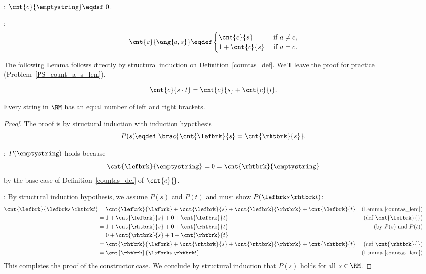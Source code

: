 \begin{definition}\label{countas_def} \mbox{}

: $\cnt{c}{\emptystring} \eqdef\ 0$.

:
\[
\cnt{c}{\ang{a,s}} \eqdef \begin{cases}
                           \cnt{c}{s}  &\text{ if } a \neq c,\\
                           1 + \cnt{c}{s} &\text{ if } a = c.
                           \end{cases}
\]
\end{definition}

The following Lemma follows directly by structural induction on
Definition~\ref{countas_def}.  We'll leave the proof for practice
(Problem~\ref{PS_count_a_s_lem}).

\begin{lemma}\label{countas_lem}
\[
\cnt{c}{s \cdot t} = \cnt{c}{s} + \cnt{c}{t}.
\]
\end{lemma}

\begin{lemma*}
Every string in $\RM$ has an equal number of left and right brackets.

\begin{proof}
The proof is by structural induction with induction hypothesis
\[
P(s) \eqdef\  \brac{\cnt{\lefbrk}{s} = \cnt{\rhtbrk}{s}}.
\]

: $P(\emptystring)$ holds because
\[
\cnt{\lefbrk}{\emptystring} = 0 = \cnt{\rhtbrk}{\emptystring}
\]
by the base case of Definition~\ref{countas_def} of $\cnt{c}{}$.

: By structural induction hypothesis, we assume
$P(s)$ and $P(t)$ and must show $P(\lefbrk s\,\rhtbrk t)$:
\begin{align*}
\cnt{\lefbrk}{\lefbrk s\,\rhtbrk t}
    & = \cnt{\lefbrk}{\lefbrk} + \cnt{\lefbrk}{s}
        +\cnt{\lefbrk}{\rhtbrk}+ \cnt{\lefbrk}{t}
         & \text{(Lemma~\ref{countas_lem})}\\
    & = 1 + \cnt{\lefbrk}{s} + 0 + \cnt{\lefbrk}{t}
         & \text{(def $\cnt{\lefbrk}{}$)}\\
    & = 1 + \cnt{\rhtbrk}{s} + 0 + \cnt{\rhtbrk}{t}
         & \text{(by $P(s)$ and $P(t)$)}\\
    & = 0 + \cnt{\rhtbrk}{s} + 1 + \cnt{\rhtbrk}{t}\\
    & = \cnt{\rhtbrk}{\lefbrk} + \cnt{\rhtbrk}{s}
        +\cnt{\rhtbrk}{\rhtbrk}+ \cnt{\rhtbrk}{t}
         & \text{(def $\cnt{\rhtbrk}{}$)}\\
    & = \cnt{\rhtbrk}{\lefbrk s\,\rhtbrk t}
            & \text{(Lemma~\ref{countas_lem})}
\end{align*}
This completes the proof of the constructor case.  We conclude by
structural induction that $P(s)$ holds for all $s \in\RM$.
\end{proof}
\end{lemma*}

